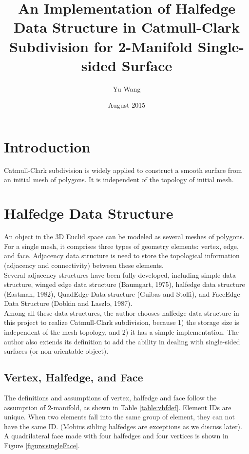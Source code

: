 \documentclass[12pt]{article}
\title{An Implementation of Halfedge Data Structure in Catmull-Clark 
Subdivision for 2-Manifold Single-sided Surface}
\author{Yu Wang}
\date{August 2015}
\begin{document}
\maketitle
\newpage


\section{Introduction}
Catmull-Clark subdivision is widely applied to construct a smooth surface from an initial mesh of polygons. It is independent of the topology of initial mesh.
\section{Halfedge Data Structure} \label{sec:halfedge}

An object in the 3D Euclid space can be modeled as several meshes of polygons. For a single mesh, it comprises three types of geometry elements: vertex, edge, and face. Adjacency data structure is need to store the topological information (adjacency and connectivity) between these elements.\\
Several adjacency structures have been fully developed, including simple data structure, winged edge data structure (Baumgart, 1975), halfedge data structure (Eastman, 1982), QuadEdge Data structure (Guibas and Stolfi), and FaceEdge Data Structure (Dobkin and Laszlo, 1987).\\
Among all these data structures, the author chooses halfedge data structure in this project to realize Catmull-Clark subdivision, because 1) the storage size is independent of the mesh topology, and 2) it has a simple implementation. The author also extends its definition to add the ability in dealing with single-sided surfaces (or non-orientable object).

\subsection{Vertex, Halfedge, and Face}

The definitions and assumptions of vertex, halfedge and face follow the assumption of 2-manifold, as shown in Table \ref{table:vhfdef}. Element IDs are unique. When two elements fall into the same group of element, they can not have the same ID. (Mobius sibling halfedges are exceptions as we discuss later). A quadrilateral face made with four halfedges and four vertices is shown in Figure \ref{figure:singleFace}.
\end{document}
